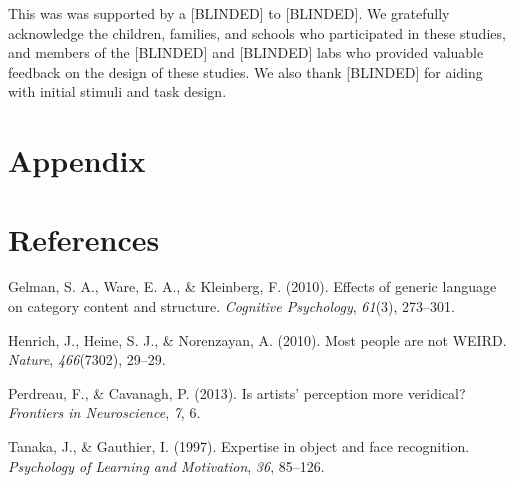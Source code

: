 \documentclass[
  man,mask]{apa6}
\newlength{\cslhangindent}
\newenvironment{CSLReferences}[2] %
 {\begin{list}{}{%
  \setlength{\itemindent}{0pt}
  \setlength{\leftmargin}{0pt}
  \setlength{\parsep}{0pt}
  \ifodd #1
   \setlength{\leftmargin}{\cslhangindent}
   \setlength{\itemindent}{-1\cslhangindent}
  \fi
  \setlength{\itemsep}{#2\baselineskip}}}
 {\end{list}}
\begin{document}
This was was supported by a {[}BLINDED{]} to {[}BLINDED{]}. We gratefully acknowledge the children, families, and schools who participated in these studies, and members of the {[}BLINDED{]} and {[}BLINDED{]} labs who provided valuable feedback on the design of these studies. We also thank {[}BLINDED{]} for aiding with initial stimuli and task design.

\section{Appendix}\label{appendix}

\section{References}\label{references}

\label{refs}
\begin{CSLReferences}{1}{0}
Gelman, S. A., Ware, E. A., \& Kleinberg, F. (2010). Effects of generic language on category content and structure. \emph{Cognitive Psychology}, \emph{61}(3), 273--301.

Henrich, J., Heine, S. J., \& Norenzayan, A. (2010). Most people are not WEIRD. \emph{Nature}, \emph{466}(7302), 29--29.

Perdreau, F., \& Cavanagh, P. (2013). Is artists' perception more veridical? \emph{Frontiers in Neuroscience}, \emph{7}, 6.

Tanaka, J., \& Gauthier, I. (1997). Expertise in object and face recognition. \emph{Psychology of Learning and Motivation}, \emph{36}, 85--126.

\end{CSLReferences}


\clearpage
\renewcommand{\listfigurename}{Figure captions}
\end{document}
